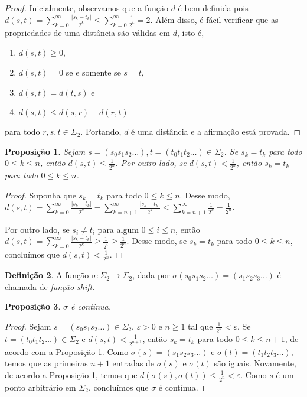 \documentclass[a4paper, 12pt]{article}
\theoremstyle{definition}
\newtheorem{definition}{Definição}[section]
\theoremstyle{plain}
\newtheorem{proposition}[definition]{Proposição}
\theoremstyle{plain}
\theoremstyle{plain}
\theoremstyle{definition}
\theoremstyle{remark}
\begin{document}
\begin{proof}
Inicialmente, observamos que a função $d$ é bem definida pois $d(s, t) = \sum_{k=0}^{\infty} \frac{|s_k - t_k|}{2^k} \leq \sum_{k=0}^{\infty} \frac{1}{2^k} = 2$. Além disso, é fácil verificar que as propriedades de uma distância são válidas em $d$, isto é,
\begin{enumerate}[label=(\alph*)]
\item $d(s, t) \geq 0$,
\item $d(s, t) = 0$ se e somente se $s = t$,
\item  $d(s, t) = d(t, s)$ e 
\item $d(s, t) \leq d(s, r) + d(r, t)$
\end{enumerate}
para todo $r, s, t \in \Sigma_2$. Portando, $d$ é uma distância e a afirmação está provada.
\end{proof}

\begin{proposition}
\label{proposition 6 1}
Sejam $s = (s_0s_1s_2\dots) , t = (t_0t_1t_2\dots) \in \Sigma_2$. Se $s_k = t_ k$ para todo $0 \leq k \leq n$, então $d(s, t) \leq \frac{1}{2^n}$. Por outro lado, se $d(s, t) < \frac{1}{2^n}$, então $s_k = t_k$ para todo $0 \leq k \leq n$.
\end{proposition}

\begin{proof}
Suponha que $s_k = t_ k$ para todo $0 \leq k \leq n$. Desse modo, $d(s, t) = \sum_{k=0}^{\infty} \frac{|s_k - t_k|}{2^k} = \sum_{k=n+1}^{\infty} \frac{|s_k - t_k|}{2^k} \leq \sum_{k=n+1}^{\infty} \frac{1}{2^k} = \frac{1}{2^n}$.

Por outro lado, se $s_i \neq t_i$ para algum $0 \leq i \leq n$, então $d(s, t) = \sum_{k=0}^{\infty} \frac{|s_k - t_k|}{2^k} \geq \frac{1}{2^i} \geq \frac{1}{2^n}$. Desse modo, se $s_k = t_k$ para todo $0 \leq k \leq n$, concluímos que $d(s, t) < \frac{1}{2^n}$.
\end{proof}

\begin{definition}
A função $\sigma: \Sigma_2 \to \Sigma_2$, dada por $\sigma(s_0s_1s_2\dots) = (s_1s_2s_3\dots)$ é chamada de \textit{função shift}.
\end{definition}

\begin{proposition}
$\sigma$ é contínua.
\end{proposition}

\begin{proof}
Sejam $s = (s_0s_1s_2\dots) \in \Sigma_2$, $\varepsilon > 0$ e $n \geq 1$ tal que $\frac{1}{2^n} < \varepsilon$. Se $t = (t_0t_1t_2\dots) \in \Sigma_ 2$ e $d(s, t) < \frac{1}{2^{n+1}}$, então $s_k = t_k$ para todo $0 \leq k \leq n+1$, de acordo com a Proposição  \ref{proposition 6 1}. Como $\sigma(s) = (s_1s_2s_3\dots)$ e $\sigma(t) = (t_1t_2t_3\dots)$, temos que as primeiras $n+1$ entradas de $\sigma(s)$ e $\sigma(t)$ são iguais. Novamente, de acordo a Proposição \ref{proposition 6 1}, temos que $d(\sigma(s), \sigma(t)) \leq \frac{1}{2^n} < \varepsilon$. Como $s$ é um ponto arbitrário em $\Sigma_2$, concluímos que $\sigma$ é contínua.
\end{proof}
\end{document}
